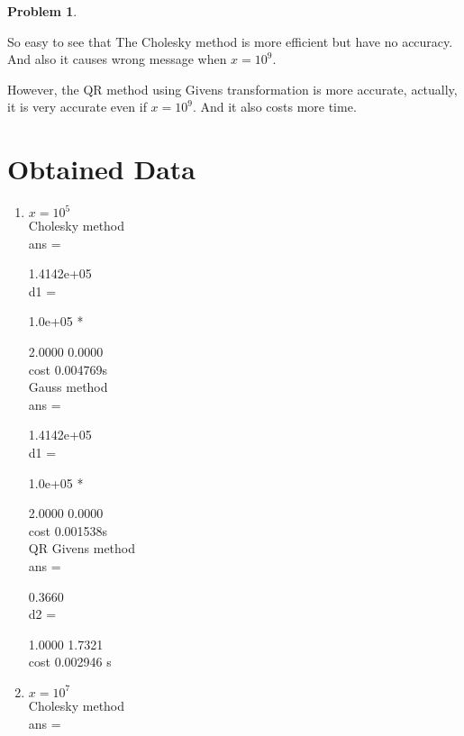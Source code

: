 \documentclass[a4paper]{article}
\theoremstyle{definition}
\newtheorem{problem}{Problem}
\theoremstyle{plain}
\numberwithin{equation}{problem}
\begin{document}
\begin{problem}
\begin{enumerate}
         So easy to see that The Cholesky method is more efficient but have no accuracy. And also it causes wrong message when  $ x=10^9 $.
         
         
         However, the QR method using Givens transformation is more accurate, actually, it is very accurate even if  $ x=10^9 $. And it also costs more time. 
         \newpage
         \appendix
         \section{Obtained Data}
         \label{sec:data}
         \begin{enumerate}
            \item  $ x=10^5 $  
        \\
        Cholesky method
        \\
        ans =
        
           1.4142e+05
        \\
        
        d1 =
        
           1.0e+05 *
        
            2.0000    0.0000
        \\
        cost 0.004769s
        \\Gauss method
        \\
        ans =
        
           1.4142e+05
        \\
        
        d1 =
        
           1.0e+05 *
        
            2.0000    0.0000
        \\
        cost 0.001538s
        \\QR Givens method
        \\
        ans =
        
            0.3660
        \\
        
        d2 =
        
            1.0000    1.7321
\\
            cost 0.002946 s\\
            \item  $ x=10^7 $\\
        
Cholesky method
\\
ans =


\end{enumerate}
\end{enumerate}
\end{problem}
\end{document}
